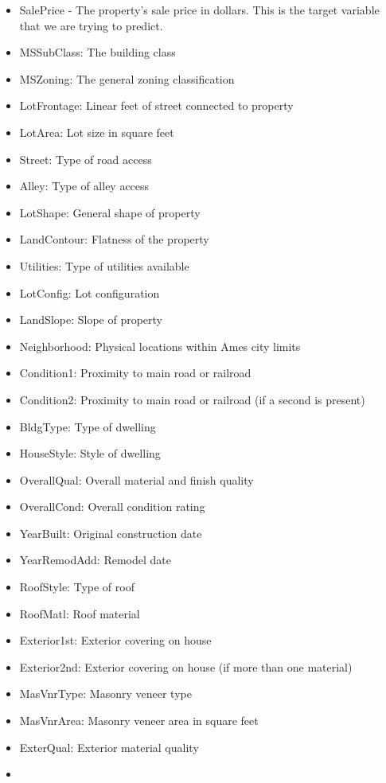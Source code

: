 \documentclass[]{article}
\providecommand{\tightlist}{%
  \setlength{\itemsep}{0pt}\setlength{\parskip}{0pt}}
\begin{document}
\begin{itemize}
\tightlist
\item
  SalePrice - The property's sale price in dollars. This is the target
  variable that we are trying to predict.
\item
  MSSubClass: The building class
\item
  MSZoning: The general zoning classification
\item
  LotFrontage: Linear feet of street connected to property
\item
  LotArea: Lot size in square feet
\item
  Street: Type of road access
\item
  Alley: Type of alley access
\item
  LotShape: General shape of property
\item
  LandContour: Flatness of the property
\item
  Utilities: Type of utilities available
\item
  LotConfig: Lot configuration
\item
  LandSlope: Slope of property
\item
  Neighborhood: Physical locations within Ames city limits
\item
  Condition1: Proximity to main road or railroad
\item
  Condition2: Proximity to main road or railroad (if a second is
  present)
\item
  BldgType: Type of dwelling
\item
  HouseStyle: Style of dwelling
\item
  OverallQual: Overall material and finish quality
\item
  OverallCond: Overall condition rating
\item
  YearBuilt: Original construction date
\item
  YearRemodAdd: Remodel date
\item
  RoofStyle: Type of roof
\item
  RoofMatl: Roof material
\item
  Exterior1st: Exterior covering on house
\item
  Exterior2nd: Exterior covering on house (if more than one material)
\item
  MasVnrType: Masonry veneer type
\item
  MasVnrArea: Masonry veneer area in square feet
\item
  ExterQual: Exterior material quality
\item

\end{itemize}
\end{document}
